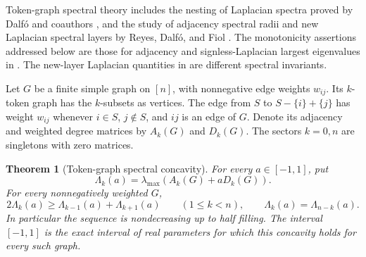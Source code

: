 \documentclass[reqno]{amsart}
\newtheorem{theorem}{Theorem}[section]
\theoremstyle{definition}
\theoremstyle{remark}
\begin{document}
Token-graph spectral theory includes the nesting of Laplacian spectra
proved by Dalf\'o and coauthors \cite{DalfoEtAl21}, and the study of
adjacency spectral radii and new Laplacian spectral layers by Reyes,
Dalf\'o, and Fiol \cite{ReyesDalfoFiol24}. The monotonicity assertions
addressed below are those for adjacency and signless-Laplacian largest
eigenvalues in \cite[Conjectures~5--6]{APS26}. The new-layer Laplacian
quantities in \cite[Definition~3.1 and Conjecture~3.3]{ReyesDalfoFiol24}
are different spectral invariants.

Let \(G\) be a finite simple graph on \([n]\), with nonnegative edge
weights \(w_{ij}\). Its \(k\)-token graph has the \(k\)-subsets as
vertices. The edge from \(S\) to \(S-\{i\}+\{j\}\) has weight
\(w_{ij}\) whenever \(i\in S\), \(j\notin S\), and \(ij\) is an
edge of \(G\). Denote its adjacency and weighted degree matrices by
\(A_k(G)\) and \(D_k(G)\). The sectors \(k=0,n\) are singletons
with zero matrices.

\begin{theorem}[Token-graph spectral concavity]\label{sector:token}
For every \(a\in[-1,1]\), put
\[
 \Lambda_k(a)=\lambda_{\max}(A_k(G)+aD_k(G)).
\]
For every nonnegatively weighted \(G\),
\[
 2\Lambda_k(a)\ge\Lambda_{k-1}(a)+\Lambda_{k+1}(a)
 \qquad(1\le k<n),\qquad
 \Lambda_k(a)=\Lambda_{n-k}(a).
\]
In particular the sequence is nondecreasing up to half filling.
The interval \([-1,1]\) is the exact interval of real parameters
for which this concavity holds for every such graph.
\end{theorem}
\end{document}
